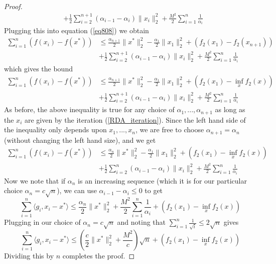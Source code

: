 \begin{proof}
\begin{align}
  &+ \frac{1}{2}\displaystyle\sum_{i = 2}^{n+1}(\alpha_{i - 1} - \alpha_{i}) \|x_i\|_2^2 + \frac{M^2}{2}\displaystyle\sum_{i = 1}^n\frac{1}{\alpha_{i}} 
 \end{align}
 Plugging this into equation (\ref{eq808}) we obtain
 \begin{align}
  \displaystyle\sum_{i = 1}^n (f(x_i) - f(x^*)) &\leq \frac{\alpha_{n+1}}{2}\|x^*\|_2^2 - \frac{\alpha_1}{2}\|x_1\|_2^2 + (f_2(x_1) - f_2(x_{n+1})) \\
  &+ \frac{1}{2}\displaystyle\sum_{i = 2}^{n+1}(\alpha_{i - 1} - \alpha_{i}) \|x_i\|_2^2 + \frac{M^2}{2}\displaystyle\sum_{i = 1}^n\frac{1}{\alpha_{i}} 
 \end{align}
 which gives the bound
 \begin{align}
  \displaystyle\sum_{i = 1}^n (f(x_i) - f(x^*)) &\leq \frac{\alpha_{n+1}}{2}\|x^*\|_2^2 - \frac{\alpha_1}{2}\|x_1\|_2^2 + (f_2(x_1) - \inf_x f_2(x)) \\
  &+ \frac{1}{2}\displaystyle\sum_{i = 2}^{n+1}(\alpha_{i - 1} - \alpha_{i}) \|x_i\|_2^2 + \frac{M^2}{2}\displaystyle\sum_{i = 1}^n\frac{1}{\alpha_{i}} 
 \end{align}
 As before, the above inequality is true for any choice of $\alpha_1,...,\alpha_{n+1}$ as long as the $x_i$ are given by the iteration
 (\ref{RDA_iteration}). Since the left hand side of the inequality only depends upon $x_1,...,x_n$, we are free to choose
 $\alpha_{n+1} = \alpha_n$ (without changing the left hand size), and we get
 \begin{align}
  \displaystyle\sum_{i = 1}^n (f(x_i) - f(x^*)) &\leq \frac{\alpha_{n}}{2}\|x^*\|_2^2 - \frac{\alpha_1}{2}\|x_1\|_2^2 + (f_2(x_1) - \inf_x f_2(x)) \\
  &+ \frac{1}{2}\displaystyle\sum_{i = 2}^{n}(\alpha_{i - 1} - \alpha_{i}) \|x_i\|_2^2 + \frac{M^2}{2}\displaystyle\sum_{i = 1}^n\frac{1}{\alpha_{i}} 
 \end{align}
 Now we note that if $\alpha_n$ is an increasing sequence (which it is for our particular choice $\alpha_n = c\sqrt{n}$), we can use 
 $\alpha_{i-1} - \alpha_i \leq 0$ to get
 \begin{equation}
  \displaystyle\sum_{i = 1}^n \langle g_i, x_i - x^*\rangle \leq\frac{\alpha_{n}}{2}\|x^*\|_2^2 + \frac{M^2}{2}\displaystyle\sum_{i = 1}^n\frac{1}{\alpha_{i}} + (f_2(x_1) - \inf_x f_2(x)) 
 \end{equation}
 Plugging in our choice of $\alpha_n = c\sqrt{n}$ and noting that $\sum_{i = 1}^n \frac{1}{\sqrt{i}} \leq 2\sqrt{n}$ gives
 \begin{equation}
  \displaystyle\sum_{i = 1}^n \langle g_i, x_i - x^*\rangle \leq\left(\frac{c}{2}\|x^*\|_2^2 + \frac{M^2}{c}\right)\sqrt{n} + (f_2(x_1) - \inf_x f_2(x))
 \end{equation}
 Dividing this by $n$ completes the proof.
 \end{proof}
 
